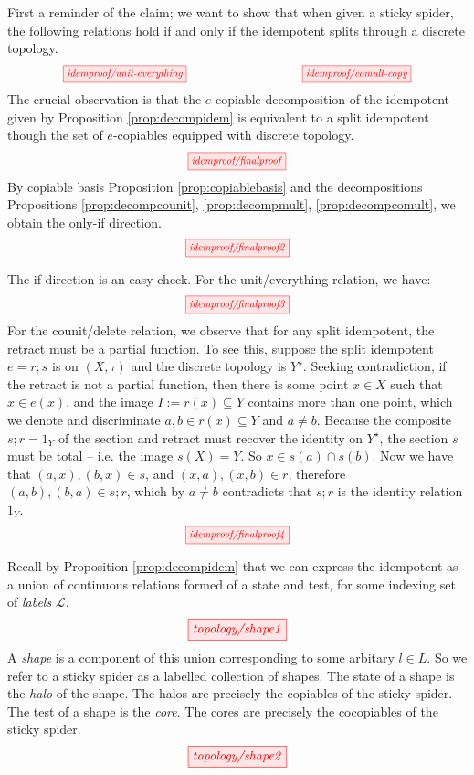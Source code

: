 \begin{myboxB}
First a reminder of the claim; we want to show that when given a sticky spider, the following relations hold if and only if the idempotent splits through a discrete topology.
\[\scalebox{0.8}{\tikzfig{idemproof/unit-everything}} \quad\quad\quad\quad\quad\quad\quad\quad \scalebox{0.8}{\tikzfig{idemproof/comult-copy}}\]
The crucial observation is that the $e$-copiable decomposition of the idempotent given by Proposition \ref{prop:decompidem} is equivalent to a split idempotent though the set of $e$-copiables equipped with discrete topology.
\[\scalebox{0.8}{\tikzfig{idemproof/finalproof}}\]
By copiable basis Proposition \ref{prop:copiablebasis} and the decompositions Propositions \ref{prop:decompcounit}, \ref{prop:decompmult}, \ref{prop:decompcomult}, we obtain the only-if direction.
\[\scalebox{0.8}{\tikzfig{idemproof/finalproof2}}\]
\end{myboxB}
\begin{myboxB}
The if direction is an easy check. For the unit/everything relation, we have:
\[\scalebox{0.8}{\tikzfig{idemproof/finalproof3}}\]
For the counit/delete relation, we observe that for any split idempotent, the retract must be a partial function. To see this, suppose the split idempotent $e = r;s$ is on $(X,\tau)$ and the discrete topology is $Y^\star$. Seeking contradiction, if the retract is not a partial function, then there is some point $x \in X$ such that $x \in e(x)$, and the image $I := r(x) \subseteq Y$ contains more than one point, which we denote and discriminate $a,b \in r(x) \subseteq Y$ and $a \neq b$. Because the composite $s;r = 1_Y$ of the section and retract must recover the identity on $Y^\star$, the section $s$ must be total -- i.e. the image $s(X) = Y$. So $x \in s(a) \cap s(b)$. Now we have that $(a,x),(b,x) \in s$, and $(x,a),(x,b) \in r$, therefore $(a,b),(b,a) \in s;r$, which by $a \neq b$ contradicts that $s;r$ is the identity relation $1_Y$.
\[\scalebox{0.8}{\tikzfig{idemproof/finalproof4}}\]
\end{myboxB}

\begin{myboxR}
\begin{defn}
Recall by Proposition \ref{prop:decompidem} that we can express the idempotent as a union of continuous relations formed of a state and test, for some indexing set of \emph{labels} $\mathcal{L}$.
\[\tikzfig{topology/shape1}\]
A \emph{shape} is a component of this union corresponding to some arbitary $l \in L$. So we refer to a sticky spider as a labelled collection of shapes. The state of a shape is the \emph{halo} of the shape. The halos are precisely the copiables of the sticky spider. The test of a shape is the \emph{core}. The cores are precisely the cocopiables of the sticky spider.
\[\tikzfig{topology/shape2}\]
\end{defn}
\end{myboxR}

